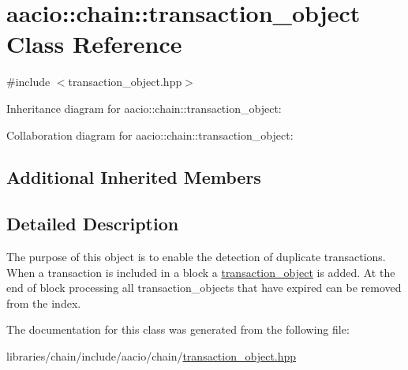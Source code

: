 \hypertarget{classaacio_1_1chain_1_1transaction__object}{}\section{aacio\+:\+:chain\+:\+:transaction\+\_\+object Class Reference}
\label{classaacio_1_1chain_1_1transaction__object}


{\ttfamily \#include $<$transaction\+\_\+object.\+hpp$>$}



Inheritance diagram for aacio\+:\+:chain\+:\+:transaction\+\_\+object\+:


Collaboration diagram for aacio\+:\+:chain\+:\+:transaction\+\_\+object\+:
\subsection*{Additional Inherited Members}


\subsection{Detailed Description}
The purpose of this object is to enable the detection of duplicate transactions. When a transaction is included in a block a \mbox{\hyperlink{classaacio_1_1chain_1_1transaction__object}{transaction\+\_\+object}} is added. At the end of block processing all transaction\+\_\+objects that have expired can be removed from the index. 

The documentation for this class was generated from the following file\+:\begin{DoxyCompactItemize}
\item 
libraries/chain/include/aacio/chain/\mbox{\hyperlink{transaction__object_8hpp}{transaction\+\_\+object.\+hpp}}\end{DoxyCompactItemize}
